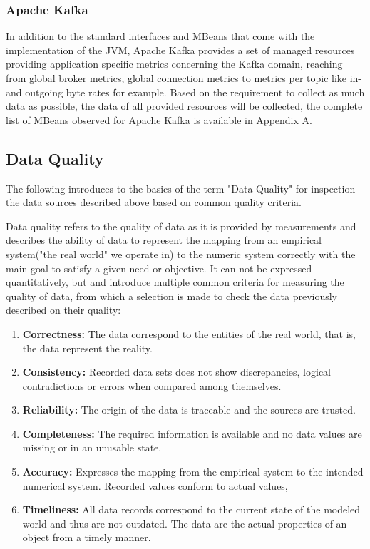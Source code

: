 \subsubsection{Apache Kafka}

In addition to the standard interfaces and MBeans that come with the implementation
of the JVM, Apache Kafka provides a set of managed resources providing application
specific metrics concerning the Kafka domain, reaching from global broker metrics, global
connection metrics to metrics per topic like in- and outgoing byte rates for example. Based
on the requirement to collect as much data as possible, the data of all provided resources
will be collected, the complete list of MBeans observed for Apache Kafka is available in
Appendix A.

\subsection{Data Quality}

The following introduces to the basics of the term "Data Quality" for inspection the data sources
described above based on common quality criteria.

Data quality refers to the quality of data as it is provided by measurements and describes the
ability of data to represent the mapping from an empirical system("the real world" we operate in)
to the numeric system correctly with the main goal to satisfy a given need or objective.
It can not be expressed quantitatively, but \cite{Daqua13} and  \cite{Ebert07} introduce multiple
common criteria for measuring the quality of data, from which a selection is made to check the data
previously described on their quality:

\begin{enumerate}
    \item \textbf{Correctness:}
    The data correspond to the entities of the real world, that is, the data represent the reality.

    \item \textbf{Consistency:}
    Recorded data sets does not show discrepancies, logical contradictions or errors when compared
    among themselves.

    \item \textbf{Reliability:}
    The origin of the data is traceable and the sources are trusted.

    \item \textbf{Completeness:}
    The required information is available and no data values are missing or in an unusable state.

    \item \textbf{Accuracy:}
    Expresses the mapping from the empirical system to the intended numerical system. Recorded values
    conform to actual values,

    \item \textbf{Timeliness:}
    All data records correspond to the current state of the modeled world and thus are not outdated.
    The data are the actual properties of an object from a timely manner.
\end{enumerate}

